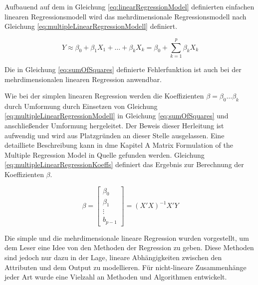 Aufbauend auf dem in Gleichung \ref{eq:linearRegressionModel} definierten einfachen linearen Regressionsmodell wird das mehrdimensionale Regressionsmodell nach Gleichung \ref{eq:multipleLinearRegressionModell} definiert. \cite[S. 71]{statistical_learning}

\begin{equation}
\label{eq:multipleLinearRegressionModell}
Y \approx \beta_0 + \beta_1 X_1 + \ldots + \beta_k X_k = \beta_0 + \sum_{k = 1}^{p} \beta_k X_k
\end{equation}

Die in Gleichung \ref{eq:sumOfSquares} definierte Fehlerfunktion ist auch bei der mehrdimensionalen linearen Regression anwendbar.

Wie bei der simplen linearen Regression werden die Koeffizienten $ \beta = \beta_0 \ldots \beta_k$ durch Umformung durch Einsetzen von Gleichung \ref{eq:multipleLinearRegressionModell} in Gleichung \ref{eq:sumOfSquares}  und anschließender Umformung hergeleitet. Der Beweis dieser Herleitung ist aufwendig und wird aus Platzgründen an dieser Stelle ausgelassen. Eine detailliete Beschreibung kann in dme Kapitel \glqq A Matrix Formulation of the Multiple Regression Model\grqq{} in Quelle \cite{regression_lecture} gefunden werden. Gleichung \ref{eq:multipleLinearRegressionKoeffs} definiert das Ergebnis zur Berechnung der Koeffizienten $\beta$.

\begin{equation}
\label{eq:multipleLinearRegressionKoeffs}
\beta = \begin{bmatrix} \beta_0 \\ \beta_1 \\ \vdots \\ b_{p-1} \end{bmatrix} = (X'X)^{-1}X'Y 
\end{equation}

Die simple und die mehrdimensionale lineare Regression wurden vorgestellt, um dem Leser eine Idee von den Methoden der Regression zu geben. Diese Methoden sind jedoch nur dazu in der Lage, lineare Abhängigkeiten zwischen den Attributen und dem Output zu modellieren. Für nicht-lineare Zusammenhänge jeder Art wurde eine Vielzahl an Methoden und Algorithmen entwickelt.

